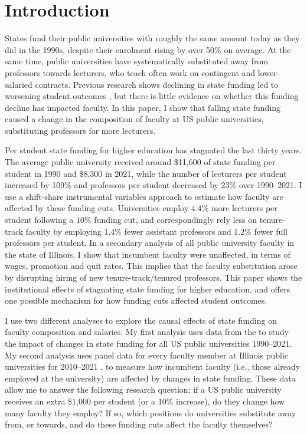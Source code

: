 \section{Introduction}
\label{sec:intro}

States fund their public universities with roughly the same amount today as they did in the 1990s, despite their enrolment rising by over 50\% on average.
At the same time, public universities have systematically substituted away from professors towards lecturers, who teach often work on contingent and lower-salaried contracts.
Previous research shows declining in state funding led to worsening student outcomes \citep{NBERw23736,NBERw27885}, but there is little evidence on whether this funding decline has impacted faculty.
In this paper, I show that falling state funding caused a change in the composition of faculty at US public universities, substituting professors for more lecturers.

Per student state funding for higher education has stagnated the last thirty years.
The average public university received around \$11,600 of state funding per student in 1990 and \$8,300 in 2021, while the number of lecturers per student increased by 109\% and professors per student decreased by $23$\% over 1990--2021.
I use a shift-share instrumental variables approach to estimate how faculty are affected by these funding cuts.
Universities employ $4.4$\% more lecturers per student following a $10$\% funding cut, and correspondingly rely less on tenure-track faculty by employing $1.4$\% fewer assistant professors and $1.2$\% fewer full professors per student.
In a secondary analysis of all public university faculty in the state of Illinois, I show that incumbent faculty were unaffected, in terms of wages, promotion and quit rates.
This implies that the faculty substitution arose by disrupting hiring of new tenure-track/tenured professors.
This paper shows the institutional effects of stagnating state funding for higher education, and offers one possible mechanism for how funding cuts affected student outcomes.

I use two different analyses to explore the causal effects of state funding on faculty composition and salaries.
My first analysis uses data from the \cite{ipeds} to study the impact of changes in state funding for all US public universities 1990--2021.
My second analysis uses panel data for every faculty member at Illinois public universities for 2010--2021 \citep{ibhed}, to measure how incumbent faculty (i.e., those already employed at the university) are affected by changes in state funding.
These data allow me to answer the following research question: if a US public university receives an extra \$1,000 per student (or a 10\% increase), do they change how many faculty they employ?
If so, which positions do universities substitute away from, or towards, and do these funding cuts affect the faculty themselves?

